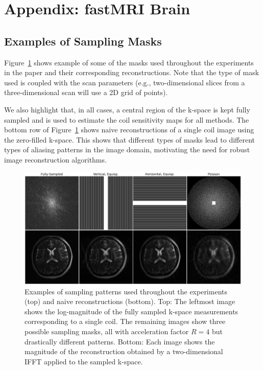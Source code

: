 \documentclass{article}
\newcounter{example}[section]
\begin{document}
\section{Appendix: fastMRI Brain}\label{app:brains}
\subsection{Examples of Sampling Masks}
Figure~\ref{fig:example_masks} shows example of some of the masks used throughout the experiments in the paper and their corresponding reconstructions. Note that the type of mask used is coupled with the scan parameters (e.g., two-dimensional slices from a three-dimensional scan will use a 2D grid of points).

We also highlight that, in all cases, a central region of the k-space is kept fully sampled and is used to estimate the coil sensitivity maps for all methods. The bottom row of Figure~\ref{fig:example_masks} shows naive reconstructions of a single coil image using the zero-filled k-space. This shows that different types of masks lead to different types of aliasing patterns in the image domain, motivating the need for robust image reconstruction algorithms.

\begin{figure}[t]
    \centering
    \includegraphics[width=\columnwidth]{paper_masks_crop.png}
    \caption{\small Examples of sampling patterns used throughout the experiments (top) and naive reconstructions (bottom). Top: The leftmost image shows the log-magnitude of the fully sampled k-space measurements corresponding to a single coil. The remaining images show three possible sampling masks, all with acceleration factor $R=4$ but drastically different patterns. Bottom: Each image shows the magnitude of the reconstruction obtained by a two-dimensional IFFT applied to the sampled k-space.}
    \label{fig:example_masks}
\end{figure}
\end{document}

